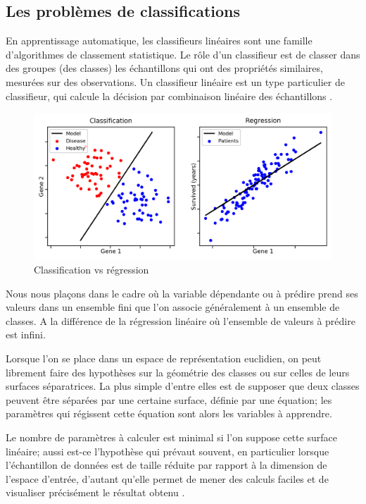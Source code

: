 	
	\subsection{Les problèmes de classifications}
		En apprentissage automatique, les classifieurs linéaires sont une famille d'algorithmes de classement statistique. Le rôle d'un classifieur est de classer dans des groupes (des classes) les échantillons qui ont des propriétés similaires, mesurées sur des observations. Un classifieur linéaire est un type particulier de classifieur, qui calcule la décision par combinaison linéaire des échantillons \cite{antoine2018apprentissage}.
		
		\begin{figure}[bth]%
			\centering
			\includegraphics[width=15cm]{images/classification_vs_regression.png}
			\caption{Classification vs régression \cite[image de][]{ml2008python}
			}
			\label{fig:class_vs_reg}
		\end{figure}
		
		Nous nous plaçons dans le cadre où la variable dépendante ou à prédire prend ses valeurs dans un ensemble fini que l'on associe généralement à un ensemble de classes. A la différence de la régression linéaire où l’ensemble de valeurs à prédire est infini.
		
		Lorsque l'on se place dans un espace de représentation euclidien, on peut librement faire des hypothèses sur la géométrie des classes ou sur celles de leurs surfaces séparatrices. La plus simple d'entre elles est de supposer que deux classes peuvent être séparées par une certaine surface, définie par une équation; les paramètres qui régissent cette équation sont alors les variables à apprendre.
		
		Le nombre de paramètres à calculer est minimal si l'on suppose cette surface linéaire; aussi est-ce l'hypothèse qui prévaut souvent, en particulier lorsque l'échantillon de données est de taille réduite par rapport à la dimension de l'espace d'entrée, d'autant qu'elle permet de mener des calculs faciles et de visualiser précisément le résultat obtenu \cite{sarkar2017practical}.
		
